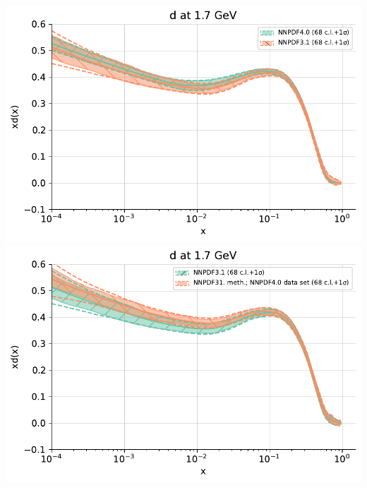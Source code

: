 \documentclass{beamer}
\begin{document}
\begin{frame}
\begin{columns}[c]
\begin{column}{0.5\textwidth}
   \begin{overlayarea}{\columnwidth}{4cm}
    {
     \centering
     \includegraphics[width=\columnwidth]{plots/d_fit_1}\\    
    }
    {
     \centering
     \includegraphics[width=\columnwidth]{plots/d_fit_2}\\    
    }
   \end{overlayarea}   
  \end{column} 
 \end{columns}
 \begin{columns}[c]
  \begin{column}{0.5\textwidth}
   \begin{overlayarea}{\columnwidth}{4cm}
    {
     \centering
}
\end{overlayarea}
\end{column}
\end{columns}
\end{frame}
\end{document}
